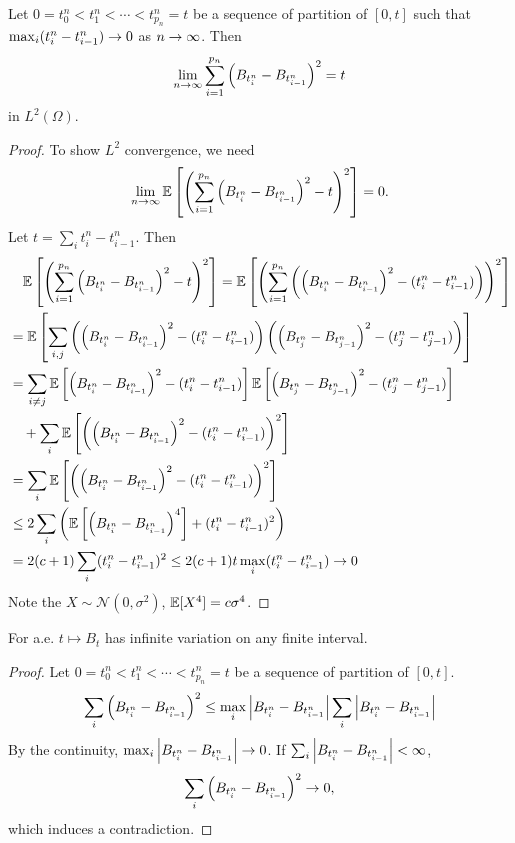 \begin{prop}
    Let $0 = t^n_0 < t^n_1 < \cdots < t^n_{p_n} = t$ be a sequence of partition of $[0,t]$ such that $\max_i (t^n_i - t^n_{i-1}) \rightarrow 0$ as $n\rightarrow \infty$. Then
    \begin{equation*}
        \lim_{n \rightarrow \infty} \sum_{i=1}^{p_n} \left(B_{t^n_i} - B_{t^n_{i-1}}\right)^2 = t
    \end{equation*}
    in $L^2(\Omega)$.
\end{prop}
\begin{proof}
    To show $L^2$ convergence, we need 
    \begin{equation*}
        \begin{aligned}
            \lim_{n \rightarrow \infty} \mathbb{E}\left[\left(\sum_{i=1}^{p_n} \left(B_{t^n_i} - B_{t^n_{i-1}}\right)^2 -t\right)^2\right] = 0.
        \end{aligned}
    \end{equation*}
    Let $t = \sum_i t_i^n - t^n_{i-1}$. Then
    \begin{align*}
        &\quad\mathbb{E}\left[\left(\sum_{i=1}^{p_n} \left(B_{t^n_i} - B_{t^n_{i-1}}\right)^2 -t\right)^2\right] = \mathbb{E}\left[\left(\sum_{i=1}^{p_n}\left( \left(B_{t^n_i} - B_{t^n_{i-1}}\right)^2 - (t_i^n - t^n_{i-1})\right)\right)^2\right] \\
        &= \mathbb{E}\left[ \sum_{i,j}  \left( \left(B_{t^n_i} - B_{t^n_{i-1}}\right)^2 - (t_i^n - t^n_{i-1})\right)\left( \left(B_{t^n_j} - B_{t^n_{j-1}}\right)^2 - (t_j^n - t^n_{j-1})\right)\right] \\
        &= \sum_{i\neq j}\mathbb{E}\left[ \left(B_{t^n_i} - B_{t^n_{i-1}}\right)^2 - (t_i^n - t^n_{i-1})\right]\mathbb{E}\left[ \left(B_{t^n_j} - B_{t^n_{j-1}}\right)^2 - (t_j^n - t^n_{j-1})\right] \\
        &\quad + \sum_i \mathbb{E}\left[\left( \left(B_{t^n_i} - B_{t^n_{i-1}}\right)^2 - (t_i^n - t^n_{i-1})\right)^2\right] \\
        &=  \sum_i \mathbb{E}\left[\left( \left(B_{t^n_i} - B_{t^n_{i-1}}\right)^2 - (t_i^n - t^n_{i-1})\right)^2\right] \\
        &\leq 2\sum_i \left( \mathbb{E}\left[\left(B_{t^n_i} - B_{t^n_{i-1}}\right)^4\right] + (t_i^n - t^n_{i-1})^2 \right) \\
        &= 2(c+1) \sum_i(t_i^n - t^n_{i-1})^2 \leq 2(c+1)t\max_i (t_i^n - t^n_{i-1}) \rightarrow 0
    \end{align*}
    Note the $X \sim \mathcal{N}(0,\sigma^2)$, $\mathbb{E}[X^4] = c \sigma^4$. \qedhere
\end{proof}
\begin{cor}
    For a.e. $t \mapsto B_t$ has infinite variation on any finite interval.
\end{cor}
\begin{proof}
    Let $0 = t^n_0 < t^n_1 < \cdots < t^n_{p_n} = t$ be a sequence of partition of $[0,t]$.
    \begin{equation*}
        \sum_i \left(B_{t^n_i} - B_{t^n_{i-1}}\right)^2 \leq \max_i \left\lvert B_{t^n_i} - B_{t^n_{i-1}}\right\lvert \sum_i \left\lvert B_{t^n_i} - B_{t^n_{i-1}}\right\lvert
    \end{equation*}
    By the continuity, $\max_i \left\lvert B_{t^n_i} - B_{t^n_{i-1}}\right\lvert \rightarrow 0$. If $\sum_i \left\lvert B_{t^n_i} - B_{t^n_{i-1}}\right\lvert < \infty$,
    \begin{equation*}
        \sum_i \left(B_{t^n_i} - B_{t^n_{i-1}}\right)^2 \rightarrow 0,
    \end{equation*}
    which induces a contradiction.
\end{proof}


